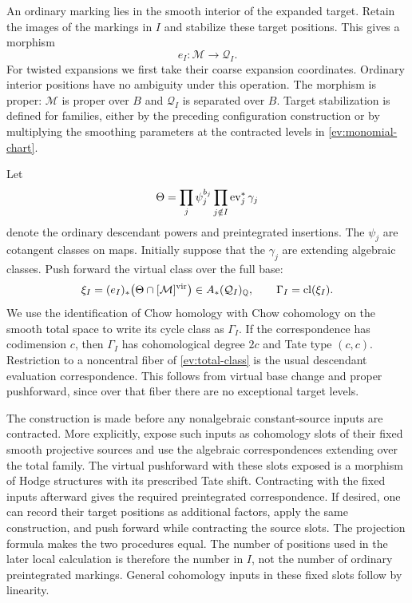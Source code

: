 An ordinary marking lies in the smooth interior of the expanded
target.  Retain the images of the markings in $I$ and stabilize these
target positions.  This gives a morphism
\begin{equation}
\label{ev:lift}
  e_I:\mathcal M\longrightarrow\mathcal Q_I.
\end{equation}
For twisted expansions we first take their coarse expansion
coordinates.  Ordinary interior positions have no ambiguity under
this operation.  The morphism is proper: $\mathcal M$ is proper over
$B$ and $\mathcal Q_I$ is separated over $B$.  Target stabilization
is defined for families, either by the preceding configuration
construction or by multiplying the smoothing parameters at the
contracted levels in \eqref{ev:monomial-chart}.

Let
\[
  \Theta=\prod_{j}\psi_j^{b_j}\prod_{j\notin I}\operatorname{ev}_j^*\gamma_j
\]
denote the ordinary descendant powers and preintegrated insertions.
The $\psi_j$ are cotangent classes on maps.  Initially suppose that
the $\gamma_j$ are extending algebraic classes.  Push forward the
virtual class over the full base:
\begin{equation}
\label{ev:total-class}
  \xi_I=(e_I)_*\bigl(\Theta\cap[\mathcal M]^{\mathrm{vir}}\bigr)
  \in A_*(\mathcal Q_I)_\mathbb Q,
  \qquad
  \Gamma_I=\operatorname{cl}(\xi_I).
\end{equation}
We use the identification of Chow homology with Chow cohomology on
the smooth total space to write its cycle class as $\Gamma_I$.
If the correspondence has codimension $c$, then $\Gamma_I$ has
cohomological degree $2c$ and Tate type $(c,c)$.
Restriction to a noncentral fiber of \eqref{ev:total-class} is the
usual descendant evaluation correspondence.  This follows from
virtual base change and proper pushforward, since over that fiber
there are no exceptional target levels.

The construction is made before any nonalgebraic constant-source
inputs are contracted.  More explicitly, expose such inputs as
cohomology slots of their fixed smooth projective sources and use
the algebraic correspondences extending over the total family.
The virtual
pushforward with these slots exposed is a morphism of Hodge
structures with its prescribed Tate shift.  Contracting with the
fixed inputs afterward gives the required preintegrated
correspondence.  If desired, one can record their target positions
as additional factors, apply the same construction, and push forward
while contracting the source slots.  The projection formula makes
the two procedures equal.  The number of positions used in the later
local calculation is therefore the number in $I$, not the number of
ordinary preintegrated markings.  General cohomology inputs in these
fixed slots follow by linearity.

